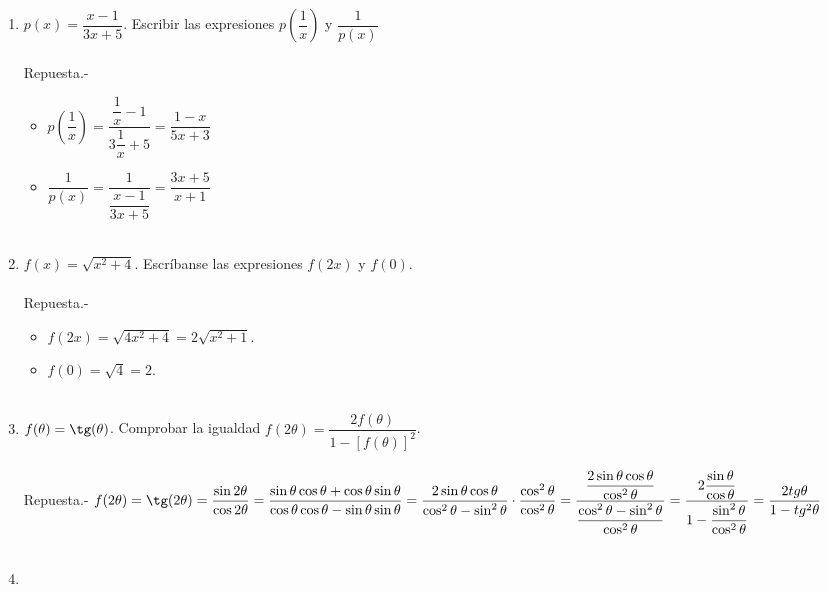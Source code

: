 \begin{enumerate}
\begin{enumerate}[\bfseries a)]
	\end{enumerate}

    \item $p(x) = \dfrac{x-1}{3x+5}$. Escribir las expresiones $p \left(\dfrac{1}{x}\right)$ y $\dfrac{1}{p(x)}$\\\\
	Repuesta.-\;
	\begin{itemize}
	    \item $p\left(\dfrac{1}{x}\right) = \dfrac{\dfrac{1}{x} - 1}{3\dfrac{1}{x} + 5}= \dfrac{1-x}{5x+3}$\\
	    \item $\dfrac{1}{p(x)} = \dfrac{1}{\dfrac{x-1}{3x+5}} = \dfrac{3x+5}{x+1}$\\\\
	\end{itemize}

    \item $f(x)=\sqrt{x^2 + 4}$. Escríbanse las expresiones $f(2x)$ y $f(0)$.\\\\
	Repuesta.-\; 
	\begin{itemize}
	    \item $f(2x)=\sqrt{4x^2 + 4} = 2\sqrt{x^2 + 1}$.
	    \item $f(0)=\sqrt{4}=2$.\\\\
	\end{itemize}

    \item $f(\theta)=\tg(\theta)$. Comprobar la igualdad $f(2\theta)=\dfrac{2f(\theta)}{1-\left[f(\theta)\right]^2}$.\\\\
	Repuesta.-\; $f(2\theta)=\tg(2\theta )= \dfrac{\sin 2\theta}{\cos 2\theta} = \dfrac{\sin \theta \cos \theta + \cos \theta \sin \theta}{\cos \theta \cos \theta - \sin \theta \sin \theta} = \dfrac{2\sin \theta \cos \theta}{\cos^2 \theta - \sin^2\theta}\cdot \dfrac{\cos^2 \theta}{\cos^2 \theta} = \dfrac{\dfrac{2\sin \theta \cos \theta}{\cos^2 \theta}}{\dfrac{\cos^2 \theta - \sin^2 \theta}{\cos^2 \theta}} = \dfrac{2\dfrac{\sin \theta}{\cos \theta}}{1-\dfrac{\sin^2 \theta}{\cos^2 \theta}} = \dfrac{2tg \theta}{1- tg^2 \theta}$\\\\

    \item

\end{enumerate}
